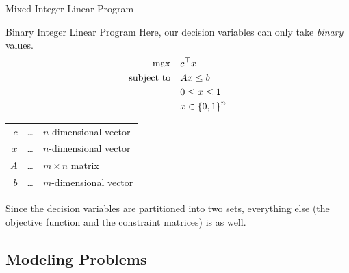 \documentclass[a4paper, 11pt]{report}
\begin{document}
\begin{defframe}{Mixed Integer Linear Program}{}
\begin{center}
\end{center}
    
\end{defframe}


\begin{defframe}{Binary Integer Linear Program}{}
Here, our decision variables can only take \textit{binary} values.
\begin{align*}
  \max \quad & c^\top x \\
  \text{subject to} \quad & Ax \le b \\
  & 0 \leq x \leq 1\\
  & x \in \set{0,1}^{n}
\end{align*}

\begin{tabular}{r c l}
  $c$ & \dots & $n$-dimensional vector \\
  $x$ & \dots & $n$-dimensional vector \\
  $A$ & \dots & $m \times n$ matrix \\
  $b$ & \dots & $m$-dimensional vector
\end{tabular}

\begin{gframe}{}
    Since the decision variables are partitioned into two sets, everything else (the objective function and the constraint matrices) is as well.
\end{gframe}

\end{defframe}

\subsection{Modeling Problems}
\end{document}

